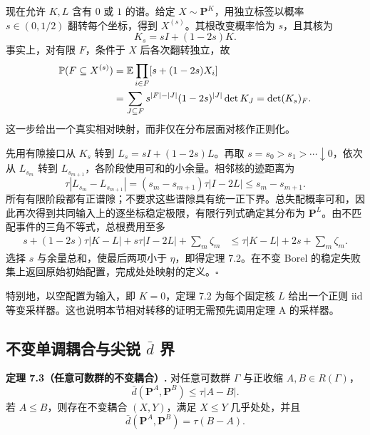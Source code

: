 \documentclass[UTF8,zihao=-4,a4paper]{ctexart}
\numberwithin{equation}{section}
\begin{document}
现在允许 $K,L$ 含有 $0$ 或 $1$ 的谱。给定 $X\sim\mathbf P^K$，用独立标签以概率 $s\in(0,1/2)$ 翻转每个坐标，得到 $X^{(s)}$。其根改变概率恰为 $s$，且其核为
\begin{equation}
K_s=sI+(1-2s)K.
\label{cd:smoothing}
\end{equation}
事实上，对有限 $F$，条件于 $X$ 后各次翻转独立，故
\begin{align}
\mathbb P(F\subseteq X^{(s)})
&=\mathbb E\prod_{i\in F}[s+(1-2s)X_i]\notag\\
&=\sum_{J\subseteq F}s^{|F|-|J|}(1-2s)^{|J|}\det K_J
=\det (K_s)_F.
\label{cd:flipdeterminant}
\end{align}
这一步给出一个真实相对映射，而非仅在分布层面对核作正则化。

先用有隙接口从 $K_s$ 转到 $L_s=sI+(1-2s)L$。再取
$s=s_0>s_1>\cdots\downarrow0$，依次从 $L_{s_m}$ 转到 $L_{s_{m+1}}$，各阶段使用可和的小余量。相邻核的迹距离为
\begin{equation}
\tau|L_{s_m}-L_{s_{m+1}}|
=(s_m-s_{m+1})\tau|I-2L|
\le s_m-s_{m+1}.
\label{cd:endpointtelescoping}
\end{equation}
所有有限阶段都有正谱隙；不要求这些谱隙具有统一正下界。总失配概率可和，因此再次得到共同输入上的逐坐标稳定极限，有限行列式确定其分布为 $\mathbf P^L$。由不匹配事件的三角不等式，总根费用至多
\begin{align}
s+(1-2s)\tau|K-L|+s\tau|I-2L|+\sum_m\zeta_m
&\le\tau|K-L|+2s+\sum_m\zeta_m.
\label{cd:singularcost}
\end{align}
选择 $s$ 与余量总和，使最后两项小于 $\eta$，即得定理 7.2。在不变 Borel 的稳定失败集上返回原始初始配置，完成处处映射的定义。\hfill$\square$

特别地，以空配置为输入，即 $K=0$，定理 7.2 为每个固定核 $L$ 给出一个正则 iid 等变采样器。这也说明本节相对转移的证明无需预先调用定理 A 的采样器。

\subsection{不变单调耦合与尖锐 \texorpdfstring{$\bar d$}{bar-d} 界}\label{cd:joining}

\textbf{定理 7.3（任意可数群的不变耦合）.}
对任意可数群 $\Gamma$ 与正收缩 $A,B\in R(\Gamma)$，
\begin{equation}
\bar d(\mathbf P^A,\mathbf P^B)\le\tau|A-B|.
\label{cd:sharpbound}
\end{equation}
若 $A\le B$，则存在不变耦合 $(X,Y)$，满足 $X\le Y$ 几乎处处，并且
\begin{equation}
\bar d(\mathbf P^A,\mathbf P^B)=\tau(B-A).
\label{cd:orderedequality}
\end{equation}
\end{document}
